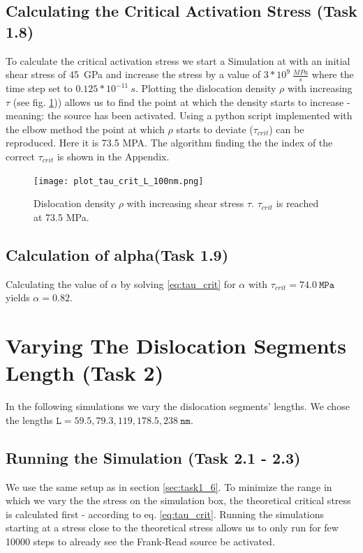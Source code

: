 \subsection{Calculating the Critical Activation Stress (Task 1.8)}
To calculate the critical activation stress we start a Simulation at with an initial shear stress of 45~GPa and increase the stress by a value of \(3*10^{9}~\frac{MPa}{s}\) where the time step set to \(0.125*10^{-11}~s\). Plotting the dislocation density \(\rho\) with increasing \(\tau\) (see fig. \ref{fig:tau_vs_rho})) allows us to find the point at which the density starts to increase - meaning: the source has been activated. Using a python script implemented with the elbow method the point at which \(\rho\) starts to deviate (\(\tau_{crit}\)) can be reproduced. Here it is 73.5 MPA. The algorithm finding the the index of the correct \(\tau_{crit}\) is shown in the Appendix.

\begin{figure}[htb]
	\centering
	\texttt{[image: plot\_tau\_crit\_L\_100nm.png]}
	\caption{Dislocation density \(\rho\) with increasing shear stress \(\tau\). \(\tau_{crit}\) is reached at 73.5 MPa. }
	\label{fig:tau_vs_rho}	
\end{figure}

\subsection{Calculation of alpha(Task 1.9)}

Calculating the value of \(\alpha\) by solving \ref{eq:tau_crit} for \(\alpha \) with \(\tau_{crit}=74.0~\mathtt{MPa} \) yields \(\alpha = 0.82\).

\section{Varying The Dislocation Segments Length (Task 2)}\label{sec:task2}
In the following simulations we vary the dislocation segments' lengths. We chose the lengths \(\mathtt{L}=59.5 , 79.3, 119, 178.5, 238~\mathtt{nm}\).
\subsection{Running the Simulation (Task 2.1 - 2.3)}
We use the same setup as in section \ref{sec:task1_6}. To minimize the range in which we vary the the stress on the simulation  box, the theoretical critical stress is calculated first - according to eq. \ref{eq:tau_crit}.  Running the simulations starting at a stress close to the theoretical stress allows us to only run for few 10000 steps to already see the Frank-Read source be activated. 

